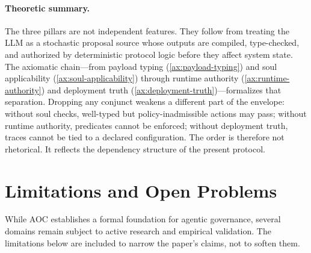 \documentclass[11pt]{article}
\theoremstyle{remark}
\newcommand{\AOC}{\textup{\textsc{AOC}}}
\begin{document}
\paragraph{Theoretic summary.}
The three pillars are not independent features. They follow from treating the LLM as a stochastic proposal source whose outputs are compiled, type-checked, and authorized by deterministic protocol logic before they affect system state. The axiomatic chain---from payload typing (\cref{ax:payload-typing}) and soul applicability (\cref{ax:soul-applicability}) through runtime authority (\cref{ax:runtime-authority}) and deployment truth (\cref{ax:deployment-truth})---formalizes that separation. Dropping any conjunct weakens a different part of the envelope: without soul checks, well-typed but policy-inadmissible actions may pass; without runtime authority, predicates cannot be enforced; without deployment truth, traces cannot be tied to a declared configuration. The order is therefore not rhetorical. It reflects the dependency structure of the present protocol.

\section{Limitations and Open Problems}\label{sec:limitations}

While \AOC{} establishes a formal foundation for agentic governance, several domains remain subject to active research and empirical validation. The limitations below are included to narrow the paper's claims, not to soften them.
\end{document}

